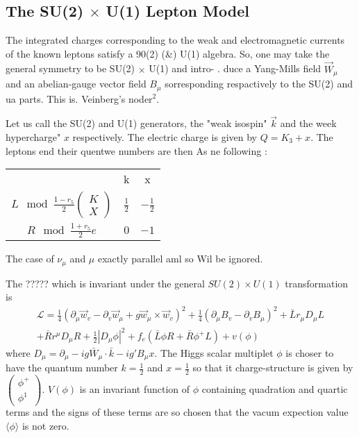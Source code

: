 \subsection*{The SU(2) $\times$ U(1) Lepton Model}

The integrated charges corresponding to the weak and electromagnetic currents of the known leptons satisfy a 90(2) (\&) U(1) algebra.
So, one may take the general symmetry to be SU(2) $\times$ U(1) and intro- .
duce a Yang-Mills field $\vec{W}_{\mu}$ and an abelian-gauge vector field $B_{\mu}$
sorresponding respactively to the SU(2) and ua parts. This is.
Veinberg's noder$^{2}$.

Let us call the SU(2) and U(1) generators, the "weak isospin"
$\vec{k}$ and the week hypercharge" $x$ respectively. The electric charge is
given by $Q= K_{3} + x$. The leptons end their quentwe numbers are then As
ne following :
\begin{center}
\begin{tabular}{ccc}
 & k & x\\
$L\mod \frac{1-r_{5}}{2} \begin{pmatrix} K \\ X \end{pmatrix}$ & $\frac{1}{2}$ & $-\frac{1}{2}$\\[0.4cm]
$R\mod \frac{1+r_{5}}{2} e$ & $0$ & $-1$
\end{tabular}
\end{center}


The case of $\nu_{\mu}$ and $\mu$ exactly parallel aml so Wil be ignored.

The ????? which is invariant under the general $SU(2) \times U(1)$  transformation is 
\begin{multline*}
\mathcal{L} = \frac{1}{4} (\partial_{\mu} \vec{w}_{v}- \partial_{v}\vec{w}_{\mu} + g \vec{w}_{\mu} \times \vec{w}_{v})^{2} + \frac{1}{4} (\partial_{\mu} B_{v}-\partial_{v}B_{\mu})^{2} + \bar{L}r_{\mu} D_{\mu}L\\
+\bar{R}r^{\mu}D_{\mu} R + \frac{1}{2} |D_{\mu} \phi|^{2} + f_{e}(\bar{L}\phi R + \bar{R}\phi^{+}L) + v(\phi)\tag{1}
\end{multline*}
where $D_{\mu} = \partial_{\mu}-ig \bar{W}_{\mu}\cdot \bar{k}-ig'B_{\mu}x$. The Higgs scalar multiplet $\phi$ is choser to have the quantum number $k=\frac{1}{2}$ and $x= \frac{1}{2}$ so that it charge-structure is given by $\begin{pmatrix} \phi^{+}\\ \phi^{1}\end{pmatrix}$. $V(\phi)$ is an invariant function of $\phi$ containing quadration and quartic terms and the signs of these terms are so chosen that the vacum expection value $\langle \phi \rangle$ is not zero.

